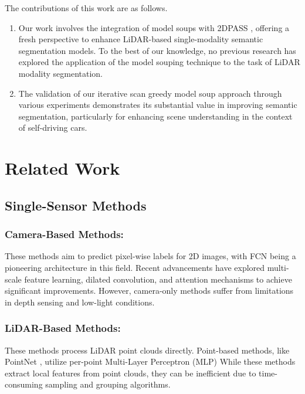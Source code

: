 \documentclass[10pt,twocolumn,letterpaper]{article}
\begin{document}
The contributions of this work are as follows. \\ 
  \begin{enumerate}
\item Our work involves the integration of model soups with 2DPASS \cite{yan20222dpass}, offering a fresh perspective to enhance LiDAR-based single-modality semantic segmentation models. To the best of our knowledge, no previous research has explored the application of the model souping technique to the task of LiDAR modality segmentation.
\item The validation of our iterative scan greedy model soup approach through various experiments demonstrates its substantial value in improving semantic segmentation, particularly for enhancing scene understanding in the context of self-driving cars.
\end{enumerate}
\section{Related Work}
\subsection{ Single-Sensor Methods
}
\subsubsection{Camera-Based Methods:}
These methods aim to predict pixel-wise labels for 2D images, with FCN \cite{long2015fully} being a pioneering architecture in this field. Recent advancements have explored multi-scale feature learning, dilated convolution, and attention mechanisms to achieve significant improvements. However, camera-only methods suffer from limitations in depth sensing and low-light conditions.\cite{he2016deep,chen2017rethinking,chen2017deeplab,lin2016efficient,zhao2017pyramid,wang2018understanding,huang2019ccnet,yuan2018ocnet}
\subsubsection{LiDAR-Based Methods:}
These methods process LiDAR point clouds directly. Point-based methods, like PointNet \cite{qi2016pointnet}, utilize per-point Multi-Layer Perceptron (MLP)\cite{rosenblatt1958perceptron} While these methods extract local features from point clouds, they can be inefficient due to time-consuming sampling and grouping algorithms.\cite{thomas2019kpconv,qi2017pointnet++,wang2019dynamic, PointConv,liu2019relation,Thomas_2019_ICCV,hua2018pointwise,yan2020pointasnl,zhao2021point,engel2021point,yan2020pointasnl,zhao2021point,engel2021point}
\end{document}
